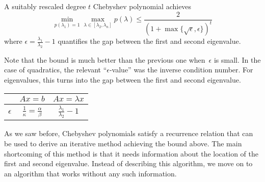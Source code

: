 %              
%               

\begin{lemma}
A suitably rescaled degree $t$ Chebyshev polynomial achieves 
\begin{equation*}
\min_{p(\lambda_1)=1} \max_{\lambda \in [\lambda_2, \lambda_n]} p(\lambda) \leq
\frac{2}{(1+\max\{\sqrt{\epsilon},\epsilon\})^t}
\end{equation*}
where $\epsilon = \frac{\lambda_1}{\lambda_2} - 1$ quantifies the gap between the first
and second eigenvalue.
\end{lemma}

Note that the bound is much better than the previous one when~$\epsilon$ is
small. In the case of quadratics, the relevant ``$\epsilon$-value'' was the inverse
condition number. For eigenvalues, this turns into the gap between the first and
second eigenvalue.

\begin{center}
\begin{tabular}{ | c |c| c | } 
\hline
 & $Ax=b$ & $Ax=\lambda x$ \\ 
\hline
$\epsilon$ & $\frac{1}{\kappa} = \frac{\alpha}{\beta}$ & $\frac{\lambda_1}{\lambda_2} -1$ \\ 
\hline
\end{tabular}
\end{center}

As we saw before, Chebyshev polynomials satisfy a recurrence relation that can
be used to derive an iterative method achieving the bound above. The main
shortcoming of this method is that it needs information about the location of
the first and second eigenvalue. Instead of describing this algorithm, we move
on to an algorithm that works without any such information.

